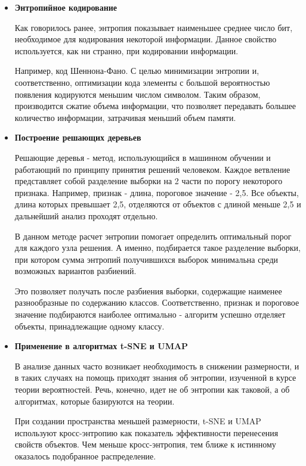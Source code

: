 \documentclass[a4paper, 12pt]{scrreprt}
\begin{document}
\begin{itemize}
	\item \textbf{Энтропийное кодирование}
	
	Как говорилось ранее, энтропия показывает наименьшее среднее число бит, необходимое для кодирования некоторой информации. Данное свойство используется, как ни странно, при кодировании информации.
	
	Например, код Шеннона-Фано. С целью минимизации энтропии и, соответственно, оптимизации кода элементы с большой вероятностью появления кодируются меньшим числом символом. Таким образом, производится сжатие объема информации, что позволяет передавать большее количество информации, затрачивая меньший объем памяти.
	
	\item \textbf{Построение решающих деревьев}
	
	Решающие деревья - метод, использующийся в машинном обучении и работающий по принципу принятия решений человеком. Каждое ветвление представляет собой разделение выборки на 2 части по порогу некоторого признака. Например, признак - длина, пороговое значение -  2,5. Все объекты, длина которых превышает 2,5, отделяются от объектов с длиной меньше 2,5 и дальнейший анализ проходят отдельно.
	
	В данном методе расчет энтропии помогает определить оптимальный порог для каждого узла решения. А именно, подбирается такое разделение выборки, при котором сумма энтропий получившихся выборок минимальна среди возможных вариантов разбиений.
	
	Это позволяет получать после разбиения выборки, содержащие наименее разнообразные по содержанию классов. Соответственно, признак и пороговое значение подбираются наиболее оптимально - алгоритм успешно отделяет объекты, принадлежащие одному классу.
	
	\item \textbf{Применение в алгоритмах t-SNE и UMAP}
	
	В анализе данных часто возникает необходимость в снижении размерности, и в таких случаях на помощь приходят знания об энтропии, изученной в курсе теории вероятностей. Речь, конечно, идет не об энтропии как таковой, а об алгоритмах, которые базируются на теории.
	
	При создании пространства меньшей размерности, t-SNE и UMAP используют кросс-энтропию как показатель эффективности перенесения свойств объектов. Чем меньше кросс-энтропия, тем ближе к истинному оказалось подобранное распределение.
	
	
\end{itemize}


\end{document}
